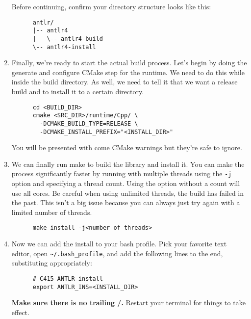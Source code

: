 \documentclass[../setup.tex]{subfiles}
\begin{document}
\begin{enumerate}
    Before continuing, confirm your directory structure looks like this:
    \begin{lstlisting}
      antlr/
      |-- antlr4
      |   \-- antlr4-build
      \-- antlr4-install
    \end{lstlisting}
  \item
    Finally, we're ready to start the actual build process. Let's begin by doing the generate and
    configure CMake step for the runtime. We need to do this while inside the build directory. As
    well, we need to tell it that we want a release build and to install it to a certain directory.
    \begin{lstlisting}
      cd <BUILD_DIR>
      cmake <SRC_DIR>/runtime/Cpp/ \
        -DCMAKE_BUILD_TYPE=RELEASE \
        -DCMAKE_INSTALL_PREFIX="<INSTALL_DIR>"
    \end{lstlisting}
    You will be presented with come CMake warnings but they're safe to ignore.
  \item
    We can finally run make to build the library and install it. You can make the process
    significantly faster by running with multiple threads using the \lstinline{-j} option and
    specifying a thread count. Using the option without a count will use all cores. Be careful when
    using unlimited threads, the build has failed in the past. This isn't a big issue because you
    can always just try again with a limited number of threads.
    \begin{lstlisting}
      make install -j<number of threads>
    \end{lstlisting}
  \item
    Now we can add the install to your bash profile. Pick your favorite text editor, open
    \lstinline{~/.bash_profile}, and add the following lines to the end, substituting
    appropriately:
    \begin{lstlisting}
      # C415 ANTLR install
      export ANTLR_INS=<INSTALL_DIR>
    \end{lstlisting}
    \textbf{Make sure there is no trailing /.} Restart your terminal for things to take effect.
\end{enumerate}
\end{document}

